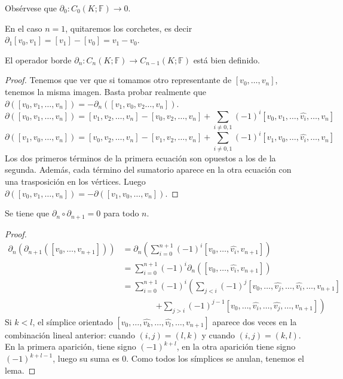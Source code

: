 \documentclass[HS.tex]{subfiles}
\begin{document}
\begin{nota}
Obsérvese que $\partial_0 \colon C_0(K; \mathbb{F}) \to 0$.

En el caso $n=1$, quitaremos los corchetes, es decir $\partial_1[v_0,v_1] = [v_1]-[v_0] = v_1 - v_0$.
\end{nota}

\begin{lemma}
El operador borde $\partial_n \colon C_n(K; \mathbb{F}) \to C_{n-1}(K; \mathbb{F})$ está bien definido.
\end{lemma}
\begin{proof}
Tenemos que ver que si tomamos otro representante de $[v_0,\dots,v_n]$, tenemos la misma imagen.
Basta probar realmente que $\partial([v_0,v_1,\dots,v_n]) = -\partial_n([v_1,v_0,v_2\dots,v_n])$.
\[ \partial([v_0,v_1,\dots,v_n]) = [v_1,v_2,\dots,v_n]-[v_0,v_2,\dots,v_n] + \sum_{i\neq0,1}(-1)^i[v_0,v_1,\dots,\widehat{v_i},\dots,v_n]\]
\[ \partial([v_1,v_0,\dots,v_n]) = [v_0,v_2,\dots,v_n]-[v_1,v_2,\dots,v_n] + \sum_{i\neq0,1}(-1)^i[v_1,v_0,\dots,\widehat{v_i},\dots,v_n]\]
Los dos primeros términos de la primera ecuación son opuestos a los de la segunda. Además, cada término del sumatorio aparece en la otra ecuación con una trasposición en los vértices.
Luego $\partial([v_0,v_1,\dots,v_n]) = -\partial([v_1,v_0,\dots,v_n])$.
\end{proof}

\begin{lemma}
Se tiene que $\partial_n \circ \partial_{n+1} = 0$ para todo $n$.
\end{lemma}
\begin{proof}
\begin{align*}
\partial_n(\partial_{n+1}([v_0,\dots,v_{n+1}])) & = \partial_n \left(\sum_{i=0}^{n+1} (-1)^i [v_0,\dots,\widehat{v_i},v_{n+1}]\right)\\
& = \sum_{i=0}^{n+1} (-1)^i \partial_n([v_0,\dots,\widehat{v_i},v_{n+1}])\\
& = \sum_{i=0}^{n+1} (-1)^i \left(\sum_{j<i} (-1)^j [v_0,\dots,\widehat{v_j},\dots,\widehat{v_i},\dots,v_{n+1}]\right. \\
& \qquad\qquad \left.+ \sum_{j>i} (-1)^{j-1} [v_0,\dots,\widehat{v_i},\dots,\widehat{v_j},\dots,v_{n+1}]\right)
\end{align*}
Si $k < l$, el símplice orientado $[v_0,\dots,\widehat{v_k},\dots,\widehat{v_l},\dots,v_{n+1}]$ aparece dos veces en la combinación lineal anterior: cuando $(i,j)=(l,k)$ y cuando $(i,j)=(k,l)$.
En la primera aparición, tiene signo $(-1)^{k+l}$, en la otra aparición tiene signo $(-1)^{k+l-1}$, luego su suma es $0$.
Como todos los símplices se anulan, tenemos el lema.
\end{proof}
\end{document}
